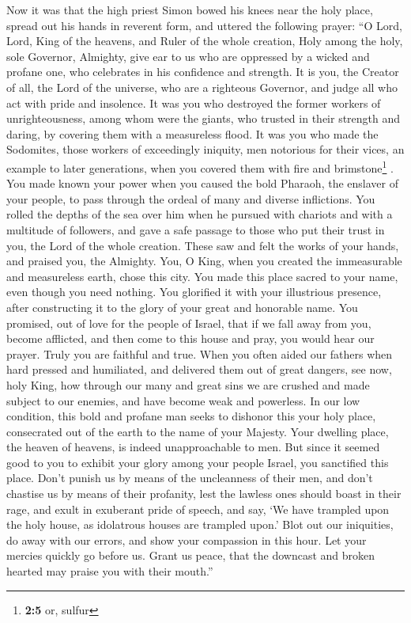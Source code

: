  Now it was that the high priest Simon bowed his knees
near the holy place, spread out his hands in reverent form, and uttered
the following prayer:  ``O Lord, Lord, King of the
heavens, and Ruler of the whole creation, Holy among the holy, sole
Governor, Almighty, give ear to us who are oppressed by a wicked and
profane one, who celebrates in his confidence and strength.
 It is you, the Creator of all, the Lord of the universe,
who are a righteous Governor, and judge all who act with pride and
insolence.  It was you who destroyed the former workers of
unrighteousness, among whom were the giants, who trusted in their
strength and daring, by covering them with a measureless flood.
 It was you who made the Sodomites, those workers of
exceedingly iniquity, men notorious for their vices, an example to later
generations, when you covered them with fire and brimstone\footnote{\textbf{2:5}
  or, sulfur} .  You made known your power when you caused
the bold Pharaoh, the enslaver of your people, to pass through the
ordeal of many and diverse inflictions.  You rolled the
depths of the sea over him when he pursued with chariots and with a
multitude of followers, and gave a safe passage to those who put their
trust in you, the Lord of the whole creation.  These saw
and felt the works of your hands, and praised you, the Almighty.
 You, O King, when you created the immeasurable and
measureless earth, chose this city. You made this place sacred to your
name, even though you need nothing. You glorified it with your
illustrious presence, after constructing it to the glory of your great
and honorable name.  You promised, out of love for the
people of Israel, that if we fall away from you, become afflicted, and
then come to this house and pray, you would hear our prayer.
 Truly you are faithful and true.  When
you often aided our fathers when hard pressed and humiliated, and
delivered them out of great dangers,  see now, holy King,
how through our many and great sins we are crushed and made subject to
our enemies, and have become weak and powerless.  In our
low condition, this bold and profane man seeks to dishonor this your
holy place, consecrated out of the earth to the name of your Majesty.
 Your dwelling place, the heaven of heavens, is indeed
unapproachable to men.  But since it seemed good to you
to exhibit your glory among your people Israel, you sanctified this
place.  Don't punish us by means of the uncleanness of
their men, and don't chastise us by means of their profanity, lest the
lawless ones should boast in their rage, and exult in exuberant pride of
speech, and say,  `We have trampled upon the holy house,
as idolatrous houses are trampled upon.'  Blot out our
iniquities, do away with our errors, and show your compassion in this
hour.  Let your mercies quickly go before us. Grant us
peace, that the downcast and broken hearted may praise you with their
mouth.''

